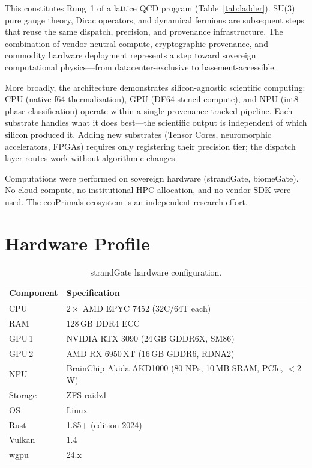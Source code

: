 \documentclass[aps,prl,twocolumn,superscriptaddress,showpacs]{revtex4-2}
\begin{document}
This constitutes Rung~1 of a lattice QCD program
(Table~\ref{tab:ladder}). SU(3) pure gauge theory, Dirac operators,
and dynamical fermions are subsequent steps that reuse the same
dispatch, precision, and provenance infrastructure. The combination of
vendor-neutral compute, cryptographic provenance, and commodity
hardware deployment represents a step toward sovereign computational
physics---from datacenter-exclusive to basement-accessible.

More broadly, the architecture demonstrates silicon-agnostic scientific
computing: CPU (native f64 thermalization), GPU (DF64 stencil compute),
and NPU (int8 phase classification) operate within a single
provenance-tracked pipeline. Each substrate handles what it does best---the
scientific output is independent of which silicon produced it. Adding new
substrates (Tensor Cores, neuromorphic accelerators, FPGAs) requires only
registering their precision tier; the dispatch layer routes work without
algorithmic changes.

\begin{acknowledgments}
Computations were performed on sovereign hardware (strandGate,
biomeGate). No cloud compute, no institutional HPC allocation, and no
vendor SDK were used. The ecoPrimals ecosystem is an independent
research effort.
\end{acknowledgments}

\appendix

\section{Hardware Profile}
\label{app:hardware}

\begin{table}[h]
\caption{strandGate hardware configuration.}
\label{tab:hardware}
\begin{ruledtabular}
\begin{tabular}{ll}
Component & Specification \\
\midrule
CPU     & $2\times$ AMD EPYC 7452 (32C/64T each) \\
RAM     & 128\,GB DDR4 ECC \\
GPU\,1  & NVIDIA RTX 3090 (24\,GB GDDR6X, SM86) \\
GPU\,2  & AMD RX 6950\,XT (16\,GB GDDR6, RDNA2) \\
NPU     & BrainChip Akida AKD1000 (80 NPs, 10\,MB SRAM, PCIe, $<$2\,W) \\
Storage & ZFS raidz1 \\
OS      & Linux \\
Rust    & 1.85+ (edition 2024) \\
Vulkan  & 1.4 \\
wgpu    & 24.x \\
\end{tabular}
\end{ruledtabular}
\end{table}
\end{document}
